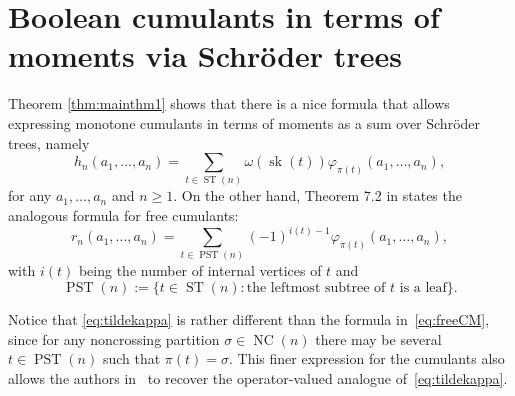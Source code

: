 \documentclass[pdftex]{sigma}%
\numberwithin{equation}{section}
\newcommand{\NC}{\operatorname{NC}}
\newcommand{\ST}{\operatorname{ST}}
\newcommand{\sk}{\operatorname{sk}}
\begin{document}
\section{Boolean cumulants in terms of moments via Schr\"oder trees}
\label{sec:boolean}


Theorem \ref{thm:mainthm1} shows that there is a nice formula that allows expressing monotone cumulants in terms of moments as a sum over Schr\"oder trees, namely
\begin{equation}
\label{eq:MonST}
h_n(a_1,\dots,a_n) = \sum_{t\in \ST(n)} \omega(\sk(t)) \varphi_{\pi(t)}(a_1,\dots,a_n),
\end{equation}
for any $a_1,\dots,a_n$ and $n\geq1$. On the other hand, Theorem 7.2 in \cite{JMNT} states the analogous formula for free cumulants:
\begin{equation}
\label{eq:tildekappa}
r_n(a_1,\dots,a_n) = \sum_{t\in \operatorname{PST}(n)} (-1)^{i(t)-1} \varphi_{\pi(t)}(a_1,\dots,a_n),
\end{equation}
with $i(t)$ being the number of internal vertices of $t$ and
\[\operatorname{PST}(n) := \{t\in \ST(n)\colon \mbox{the leftmost subtree of $t$ is a leaf} \}.\]

Notice that \eqref{eq:tildekappa} is rather different than the formula in~\eqref{eq:freeCM}, since for any noncrossing partition $\sigma\in \NC(n)$ there may be several $t\in \operatorname{PST}(n)$ such that $\pi(t)=\sigma$. This finer expression for the cumulants also allows the authors in~\cite{JMNT} to recover the operator-valued analogue of~\eqref{eq:tildekappa}.
\end{document}
